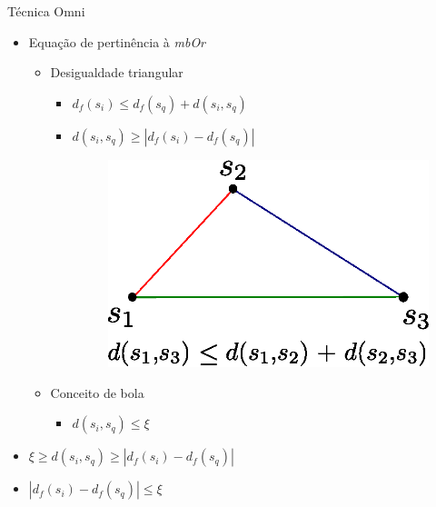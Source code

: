 \documentclass{beamer}
\begin{document}
\begin{frame}{Técnica Omni}	
	\begin{itemize}
	 \item Equação de pertinência à \textit{mbOr}\newline
	    \begin{itemize}
	      \item Desigualdade triangular\newline
		\begin{itemize}
		  \item $d_{f}(s_i) \leq d_{f}(s_q) + d(s_i, s_q)$\newline
		  
		  \item $d(s_i, s_q) \geq |d_{f}(s_i) - d_{f}(s_q)|$\newline
		      \begin{figure}[!H]
			\vspace{-2.5cm}
			\hspace{4cm}
			\includegraphics[width=.35\textwidth]{desig_tri.eps}
		      \end{figure}
		\end{itemize}
	      \item Conceito de bola\newline
		\begin{itemize}
		  \item $d(s_i, s_q) \leq \xi$\newline
		\end{itemize}
	    \end{itemize}
	\item $\xi \geq d(s_i,s_q) \geq |d_f(s_i) - d_f(s_q)|$\newline
	\item $|d_f(s_i) - d_f(s_q)| \leq \xi$
	\end{itemize}

\end{frame}
\end{document}
